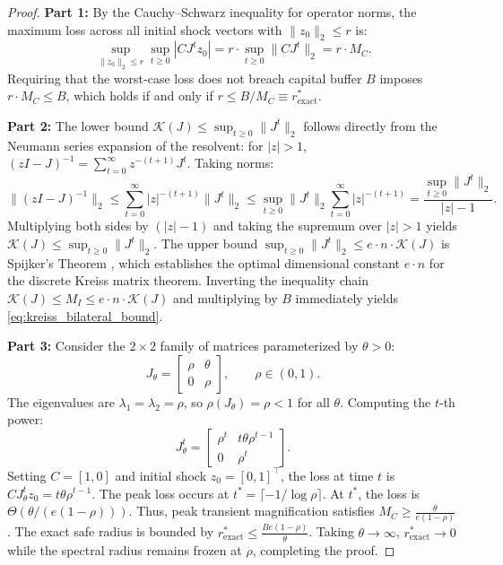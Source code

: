 \documentclass[12pt]{article}
\theoremstyle{definition}
\theoremstyle{remark}
\begin{document}
\begin{proof}
\textbf{Part 1:} By the Cauchy--Schwarz inequality for operator norms, the maximum loss across all initial shock vectors with $\|z_0\|_2 \le r$ is:
\begin{equation}
\sup_{\|z_0\|_2 \le r} \sup_{t \ge 0} |C J^t z_0| = r \cdot \sup_{t \ge 0} \|C J^t\|_2 = r \cdot M_C.
\end{equation}
Requiring that the worst-case loss does not breach capital buffer $B$ imposes $r \cdot M_C \le B$, which holds if and only if $r \le B / M_C \equiv r^*_{\text{exact}}$.

\textbf{Part 2:} The lower bound $\mathcal{K}(J) \le \sup_{t \ge 0} \|J^t\|_2$ follows directly from the Neumann series expansion of the resolvent: for $|z| > 1$, $(zI - J)^{-1} = \sum_{t=0}^\infty z^{-(t+1)} J^t$. Taking norms:
\begin{equation}
\|(zI - J)^{-1}\|_2 \le \sum_{t=0}^\infty |z|^{-(t+1)} \|J^t\|_2 \le \sup_{t \ge 0} \|J^t\|_2 \sum_{t=0}^\infty |z|^{-(t+1)} = \frac{\sup_{t \ge 0} \|J^t\|_2}{|z| - 1}.
\end{equation}
Multiplying both sides by $(|z| - 1)$ and taking the supremum over $|z| > 1$ yields $\mathcal{K}(J) \le \sup_{t \ge 0} \|J^t\|_2$.
The upper bound $\sup_{t \ge 0} \|J^t\|_2 \le e \cdot n \cdot \mathcal{K}(J)$ is Spijker's Theorem \citep{spijker1991}, which establishes the optimal dimensional constant $e \cdot n$ for the discrete Kreiss matrix theorem.
Inverting the inequality chain $\mathcal{K}(J) \le M_I \le e \cdot n \cdot \mathcal{K}(J)$ and multiplying by $B$ immediately yields \eqref{eq:kreiss_bilateral_bound}.

\textbf{Part 3:} Consider the $2 \times 2$ family of matrices parameterized by $\theta > 0$:
\begin{equation}
J_\theta = \begin{bmatrix} \rho & \theta \\ 0 & \rho \end{bmatrix}, \qquad \rho \in (0, 1).
\end{equation}
The eigenvalues are $\lambda_1 = \lambda_2 = \rho$, so $\rho(J_\theta) = \rho < 1$ for all $\theta$.
Computing the $t$-th power:
\begin{equation}
J_\theta^t = \begin{bmatrix} \rho^t & t \theta \rho^{t-1} \\ 0 & \rho^t \end{bmatrix}.
\end{equation}
Setting $C = [1, 0]$ and initial shock $z_0 = [0, 1]^\top$, the loss at time $t$ is $C J_\theta^t z_0 = t \theta \rho^{t-1}$.
The peak loss occurs at $t^* = \lceil -1 / \log \rho \rceil$. At $t^*$, the loss is $\Theta(\theta / (e (1 - \rho)))$.
Thus, peak transient magnification satisfies $M_C \ge \frac{\theta}{e (1 - \rho)}$.
The exact safe radius is bounded by $r^*_{\text{exact}} \le \frac{B e (1 - \rho)}{\theta}$.
Taking $\theta \to \infty$, $r^*_{\text{exact}} \to 0$ while the spectral radius remains frozen at $\rho$, completing the proof.
\end{proof}
\end{document}
